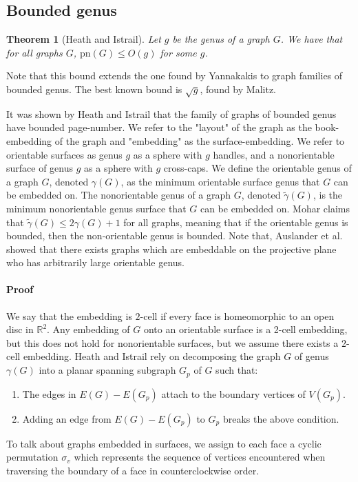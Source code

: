\documentclass[]{report}
\newcommand{\pn}{\text{pn}}
\newtheorem{theorem}{Theorem}
\theoremstyle{definition}
\numberwithin{theorem}{section}
\numberwithin{equation}{section}
\begin{document}
\subsection{Bounded genus}\label{ssec:pagenumber_bounded_genus}
\begin{theorem}[Heath and Istrail\cite{heathPagenumberGenusGraphs1992}]\label{thm:Genus_pagenumber_bound}
	Let $g$ be the genus of a graph $G$. We have that for all graphs $G$, $\pn(G) \leq O(g)$ for some $g$.
\end{theorem}
Note that this bound extends the one found by Yannakakis \cite{yannakakisEmbeddingPlanarGraphs1989b} to graph families of bounded genus. 
The best known bound is $\sqrt{g}$, found by Malitz\cite{malitzGenusGraphsHave1994}.

It was shown by Heath and Istrail that the family of graphs of bounded genus have bounded page-number. 
We refer to the "layout" of the graph as the book-embedding of the graph and "embedding" as the surface-embedding. We refer to orientable surfaces as genus $g$ as a sphere with $g$ handles, and a nonorientable surface of genus $g$ as a sphere with $g$ cross-caps. We define the orientable genus of a graph $G$, denoted $\gamma(G)$, as the minimum orientable surface genus that $G$ can be embedded on. The nonorientable genus of a graph $G$, denoted $\tilde{\gamma}(G)$, is the minimum nonorientable genus surface that $G$ can be embedded on. Mohar\cite{moharOrientableGenusGraphs1998} claims that $\tilde{\gamma}(G) \leq 2 \gamma(G) + 1$ for all graphs, meaning that if the orientable genus is bounded, then the non-orientable genus is bounded. Note that, Auslander et al.\cite{auslanderImbeddingGraphsManifolds1963} showed that there exists graphs which are embeddable on the projective plane who has arbitrarily large orientable genus. 
\paragraph{Proof}
We say that the embedding is $2$-cell if every face is homeomorphic to an open disc in $\mathbb{R}^2$. Any embedding of $G$ onto an orientable surface is a 2-cell embedding, but this does not hold for nonorientable surfaces, but we assume there exists a $2$-cell embedding.
Heath and Istrail rely on decomposing the graph $G$ of genus $\gamma(G)$ into a planar spanning subgraph $G_p$ of $G$ such that:
\begin{enumerate}
	\item The edges in $E(G) - E(G_p)$ attach to the boundary vertices of $V(G_p)$. 
	\item Adding an edge from $E(G) - E(G_p)$ to $G_p$ breaks the above condition. 
\end{enumerate}
To talk about graphs embedded in surfaces, we assign to each face a cyclic permutation $\sigma_v$ which represents the sequence of vertices encountered when traversing the boundary of a face in counterclockwise order.
\end{document}
